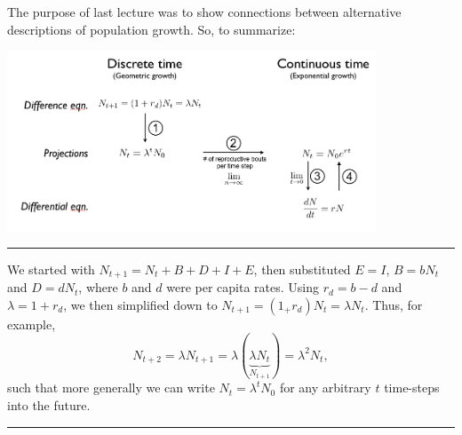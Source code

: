 \documentclass{article}
\newcommand*\circled[1]{\tikz[baseline=(char.base)]{
            \node[shape=circle,draw,inner sep=2pt] (char) {#1};}}
\begin{document}
\noindent{}

The purpose of last lecture was to show connections between alternative descriptions of population growth.  So, to summarize:

\begin{center}
\includegraphics[width=11cm]{figs/EqnConnections.png}
\end{center}

\rule[0.5ex]{\linewidth}{1pt}

\circled{1}
We started with $N_{t+1}=N_t + B + D + I +E$, then substituted $E=I$, $B=bN_t$ and $D=dN_t$, where $b$ and $d$ were per capita rates.
Using $r_d=b-d$ and $\lambda = 1+r_d$, we then simplified down to $N_{t+1} = (1_+r_d)N_t = \lambda N_t$.  Thus, for example,
\begin{equation*}
	N_{t+2}=\lambda N_{t+1}= \lambda (\underbrace{\lambda N_t}_{N_{t+1}}) = \lambda^2 N_t,
\end{equation*}
such that more generally we can write $\boxed{N_t=\lambda^t N_0}$ for any arbitrary $t$ time-steps into the future.

\rule[0.5ex]{\linewidth}{1pt}
\end{document}
